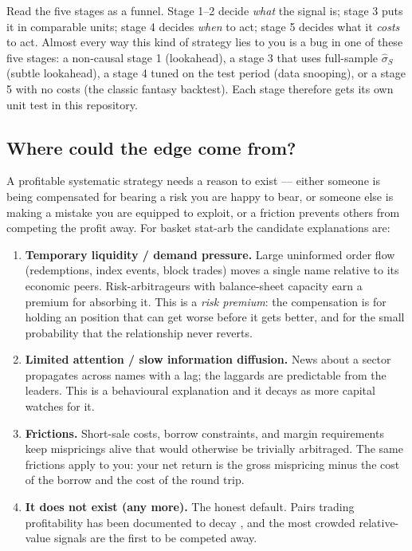 \begin{intuition}
Read the five stages as a funnel. Stage 1--2 decide \emph{what} the signal is; stage 3
puts it in comparable units; stage 4 decides \emph{when} to act; stage 5 decides what it
\emph{costs} to act. Almost every way this kind of strategy lies to you is a bug in one
of these five stages: a non-causal stage 1 (lookahead), a stage 3 that uses full-sample
$\hat\sigma_S$ (subtle lookahead), a stage 4 tuned on the test period (data snooping),
or a stage 5 with no costs (the classic fantasy backtest). Each stage therefore gets
its own unit test in this repository.
\end{intuition}

\subsection{Where could the edge come from?}
\label{sec:saa:economics}

A profitable systematic strategy needs a reason to exist --- either someone is being
compensated for bearing a risk you are happy to bear, or someone else is making a
mistake you are equipped to exploit, or a friction prevents others from competing the
profit away. For basket stat-arb the candidate explanations are:

\begin{enumerate}
  \item \textbf{Temporary liquidity / demand pressure.} Large uninformed order flow
    (redemptions, index events, block trades) moves a single name relative to its
    economic peers. Risk-arbitrageurs with balance-sheet capacity earn a premium for
    absorbing it. This is a \emph{risk premium}: the compensation is for holding an
    position that can get worse before it gets better, and for the small probability
    that the relationship never reverts.
  \item \textbf{Limited attention / slow information diffusion.} News about a sector
    propagates across names with a lag; the laggards are predictable from the leaders.
    This is a behavioural explanation and it decays as more capital watches for it.
  \item \textbf{Frictions.} Short-sale costs, borrow constraints, and margin
    requirements keep mispricings alive that would otherwise be trivially arbitraged.
    The same frictions apply to you: your net return is the gross mispricing minus the
    cost of the borrow and the cost of the round trip.
  \item \textbf{It does not exist (any more).} The honest default. Pairs trading
    profitability has been documented to decay \cite{dofaff2010does}, and the most
    crowded relative-value signals are the first to be competed away.
\end{enumerate}

